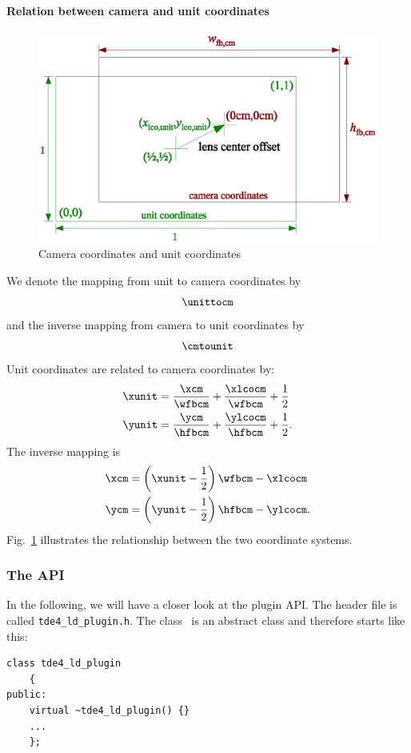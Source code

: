 \documentclass[10pt,a4paper]{article}
\begin{document}
\paragraph{Relation between camera and unit coordinates}
\begin{figure}[ht]
\centering
\includegraphics[width=12.5cm]{unit_coords_vs_camera_coords}
\caption{Camera coordinates and unit coordinates}
\label{fig:CoordinatesCameraVsUnit}
\end{figure}
We denote the mapping from unit to camera coordinates by
\begin{equation}
\unittocm
\end{equation}
and the inverse mapping from camera to unit coordinates by
\begin{equation}
\cmtounit
\end{equation}
Unit coordinates are related to camera coordinates by:
\begin{align}
\label{eq:DefinitionCmToUnit}
\xunit &= \frac \xcm \wfbcm + \frac \xlcocm \wfbcm + \frac 1 2 \nonumber\\
\yunit &= \frac \ycm \hfbcm + \frac \ylcocm \hfbcm + \frac 1 2.
\end{align}
The inverse mapping is
\begin{align}
\label{eq:DefinitionUnitToCm}
\xcm &= \left(\xunit - \frac 1 2\right) \wfbcm - \xlcocm \nonumber\\
\ycm &= \left(\yunit - \frac 1 2\right) \hfbcm - \ylcocm.
\end{align}
Fig.~\ref{fig:CoordinatesCameraVsUnit} illustrates the relationship between
the two coordinate systems.
%
\subsubsection{The API}
In the following, we will have a closer look at the plugin API.
The header file is called {\tt tde4\_ld\_plugin.h}.
The class \tdeldplugin\ is an abstract class and therefore starts like this:
\begin{lstlisting}[language=mycpp]
class tde4_ld_plugin
	{
public:
	virtual ~tde4_ld_plugin() {}
	...
	};
\end{lstlisting}
\end{document}
